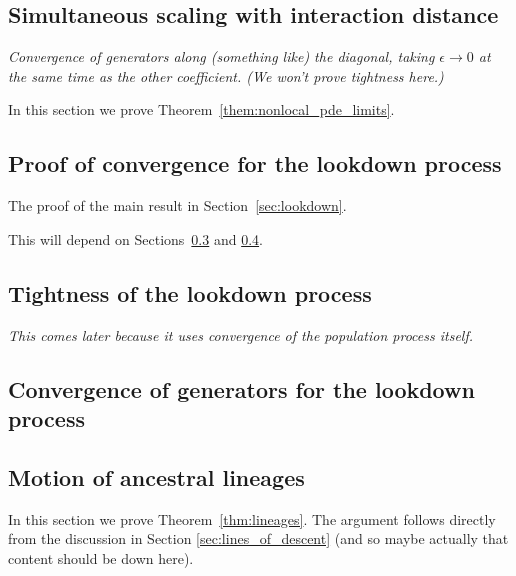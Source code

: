 \documentclass[12pt]{article}
\newcommand{\comment}[1]{{\color{blue} \it #1}}
\begin{document}
\subsection{Simultaneous scaling with interaction distance}

\comment{
    Convergence of generators along (something like) the diagonal,
    taking $\epsilon \to 0$ at the same time as the other coefficient.
    (We won't prove tightness here.)
}

In this section we prove Theorem~\ref{them:nonlocal_pde_limits}.



\subsection{Proof of convergence for the lookdown process}

The proof of the main result in Section~\ref{sec:lookdown}.

This will depend on Sections~\ref{sec:lookdown_tightness_proofs}
and \ref{sec:lookdown_generator_proofs}.


\subsection{Tightness of the lookdown process}
    \label{sec:lookdown_tightness_proofs}

\comment{
    This comes later because it uses convergence of the population process itself.
}


\subsection{Convergence of generators for the lookdown process}
    \label{sec:lookdown_generator_proofs}



\subsection{Motion of ancestral lineages}

In this section we prove Theorem~\ref{thm:lineages}.
The argument follows directly from the discussion in Section \ref{sec:lines_of_descent}
(and so maybe actually that content should be down here).
\end{document}
